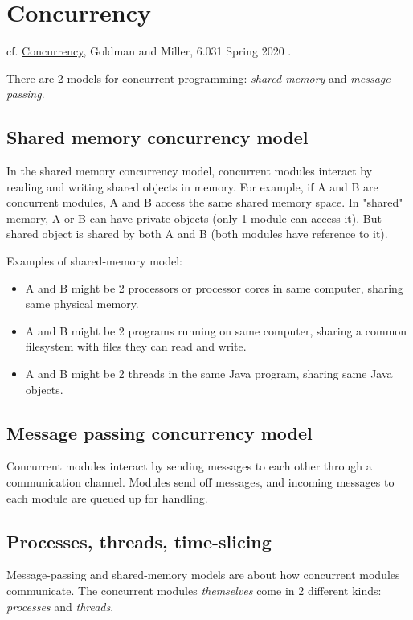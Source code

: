 \documentclass[10pt]{amsart}
\begin{document}
\section{Concurrency}

cf. \href{http://web.mit.edu/6.031/www/sp20/classes/20-concurrency/}{Concurrency}, Goldman and Miller, 6.031 Spring 2020 \cite{6dot005and6dot031}. 

There are 2 models for concurrent programming: \emph{shared memory} and \emph{message passing}. 

\subsection{Shared memory concurrency model}

In the shared memory concurrency model, concurrent modules interact by reading and writing shared objects in memory. For example, if A and B are concurrent modules, A and B access the same shared memory space. In "shared" memory, A or B can have private objects (only 1 module can access it). But shared object is shared by both A and B (both modules have reference to it).

Examples of shared-memory model:
\begin{itemize}
	\item A and B might be 2 processors or processor cores in same computer, sharing same physical memory.
	\item A and B might be 2 programs running on same computer, sharing a common filesystem with files they can read and write.
	\item A and B might be 2 threads in the same Java program, sharing same Java objects.
\end{itemize}

\subsection{Message passing concurrency model}

Concurrent modules interact by sending messages to each other through a communication channel. Modules send off messages, and incoming messages to each module are queued up for handling.

\subsection{Processes, threads, time-slicing}

Message-passing and shared-memory models are about how concurrent modules communicate. The concurrent modules \emph{themselves} come in 2 different kinds: \emph{processes} and \emph{threads}. \\
\end{document}
